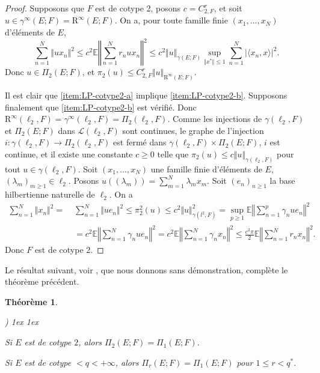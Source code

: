 \documentclass{smfart}
\theoremstyle{plain}
\newtheorem{theorem}{Théorème}[section]
\theoremstyle{definition}
\newcommand{\EE}{\mathbb E}
\newcommand{\err}{\mathrm{R}}
\newcounter{aufzi}
\newenvironment{aufzi}{\begin{list}{ {\upshape\alph{aufzi})}}{
        \usecounter{aufzi}
        \topsep1ex
        \parsep0cm
        \itemsep1ex
        \leftmargin0.8cm
        \labelwidth0.5cm
        \labelsep0.3cm
}}
{\end{list}}
\begin{document}
\begin{proof} Supposons que $F$ est de cotype 2, posons $c=C_{2,F}^r$,
  et soit $u \in \gamma^\infty(E; F)=\err^\infty(E; F)$. On a, pour toute
  famille finie $(x_1,\dots,x_N)$ d'éléments de $E$,
\[
    \sum_{n=1}^N\Vert ux_n\Vert^2\le c^2\EE\left \Vert \sum \limits _{n=1}^Nr_nux_n\right \Vert^2\le c^2 \Vert u \Vert_{\gamma(E; F)}\sup_{\Vert x^*\Vert\le 1}\sum \limits_{n=1}^N\left | \langle x_n,x \rangle \right  |^2.
\]
Donc $u \in \Pi_2(E; F)$, et $\pi_2(u) \le C^r_{2,F}\Vert u \Vert _{\err^\infty(E; F)}$.

Il est clair que \ref{item:LP-cotype2-a} implique
\ref{item:LP-cotype2-b}.  Supposons finalement que
\ref{item:LP-cotype2-b} est vérifié. Donc
$\err^\infty(\ell_2,F)=\gamma^{\infty}(\ell_2,F)=\Pi_2(\ell_2,F)$. Comme
les injections de $\gamma(\ell_2,F)$ et $\Pi_2(E; F)$ dans ${\mathcal
  L}(\ell_2,F)$ sont continues, le graphe de l'injection $i:
\gamma(\ell_2,F)\to \Pi_2(\ell_2,F)$ est fermé dans
$\gamma(\ell_2,F)\times \Pi_2(E; F)$, $i$ est continue, et il existe
une constante $c\ge 0$ telle que $\pi_2(u) \le c\Vert u \Vert
_{\gamma(\ell_2,F)}$ pour tout $u \in \gamma(\ell_2,F)$.
Soit $(x_1,\dots, x_N)$ une famille finie d'éléments de $E$,
$(\lambda_m)_{m\ge 1} \in \ell_2$.  Posons $u((\lambda_m))=\sum
\limits_{m=1}^N \lambda_mx_m$. Soit $(e_n)_{n\ge 1}$ la base
hilbertienne naturelle de $\ell_2$. On a
\begin{align*}
    \sum \limits_{n=1}^N\Vert x_n\Vert^2 = & \; \sum_{n=1}^N\Vert ue_n\Vert^2\le \pi^2_2(u)\le c^2\Vert u \Vert^2_{\gamma(l^2,F)}=\sup_{p\ge 1}\EE \left \Vert \sum_{n=1}^p\gamma_nue_n\right \Vert^2\\
    & \; =c^2 \EE \left \Vert \sum_{n=1}^N\gamma_nue_n\right \Vert^2=c^2\EE \left \Vert \sum_{n=1}^N\gamma_nx_n\right \Vert^2\le \tfrac{c^2\pi}{2}\EE \left \Vert \sum_{n=1}^Nr_nx_n\right \Vert^2.
\end{align*}
Donc $F$ est de cotype 2.
\end{proof}

\noindent Le résultat suivant, voir \cite [Corollaire 11.16]{DJT}, que nous
donnons sans démonstration, complète le théorème
précédent.

\begin{theorem}
  \begin{aufzi}
  \item Si $E$ est de cotype $2$, alors $\Pi_2(E; F)=\Pi_1(E; F)$.
  \item Si $E$ est de cotype $<q<+\infty$, alors
    $\Pi_r(E; F)=\Pi_1(E; F)$ pour $1\le r < q^*$.
\end{aufzi}
\end{theorem}
\end{document}
